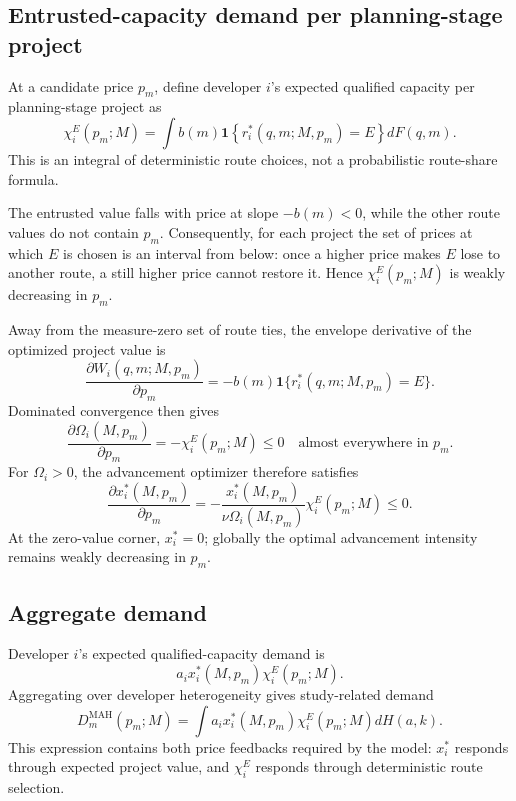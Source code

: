 \subsection{Entrusted-capacity demand per planning-stage project}
\label{subsec:p06-project-demand}

At a candidate price \(p_m\), define developer \(i\)'s expected qualified
capacity per planning-stage project as
\begin{equation}
  \chi_i^E(p_m;M)
  =
  \int
  b(m)
  \mathbf 1
  \left\{
    r_i^*(q,m;M,p_m)=E
  \right\}
  dF(q,m).
  \label{eq:p06-entrusted-capacity}
\end{equation}
This is an integral of deterministic route choices, not a probabilistic
route-share formula.

The entrusted value falls with price at slope \(-b(m)<0\), while the other
route values do not contain \(p_m\). Consequently, for each project the set
of prices at which \(E\) is chosen is an interval from below: once a higher
price makes \(E\) lose to another route, a still higher price cannot restore
it. Hence \(\chi_i^E(p_m;M)\) is weakly decreasing in \(p_m\).

Away from the measure-zero set of route ties, the envelope derivative of the
optimized project value is
\[
  \frac{\partial W_i(q,m;M,p_m)}{\partial p_m}
  =
  -b(m)
  \mathbf 1\{r_i^*(q,m;M,p_m)=E\}.
\]
Dominated convergence then gives
\begin{equation}
  \frac{\partial\Omega_i(M,p_m)}{\partial p_m}
  =
  -\chi_i^E(p_m;M)
  \leq0
  \quad\text{almost everywhere in }p_m.
  \label{eq:p06-omega-price-envelope}
\end{equation}
For \(\Omega_i>0\), the advancement optimizer therefore satisfies
\begin{equation}
  \frac{\partial x_i^*(M,p_m)}{\partial p_m}
  =
  -\frac{x_i^*(M,p_m)}
  {\nu\Omega_i(M,p_m)}
  \chi_i^E(p_m;M)
  \leq0.
  \label{eq:p06-advancement-price-response}
\end{equation}
At the zero-value corner, \(x_i^*=0\); globally the optimal advancement
intensity remains weakly decreasing in \(p_m\).

\subsection{Aggregate demand}
\label{subsec:p06-demand}

Developer \(i\)'s expected qualified-capacity demand is
\[
  a_ix_i^*(M,p_m)\chi_i^E(p_m;M).
\]
Aggregating over developer heterogeneity gives study-related demand
\begin{equation}
  D_m^{\mathrm{MAH}}(p_m;M)
  =
  \int
  a_ix_i^*(M,p_m)\chi_i^E(p_m;M)
  dH(a,k).
  \label{eq:p06-study-demand}
\end{equation}
This expression contains both price feedbacks required by the model:
\(x_i^*\) responds through expected project value, and
\(\chi_i^E\) responds through deterministic route selection.

